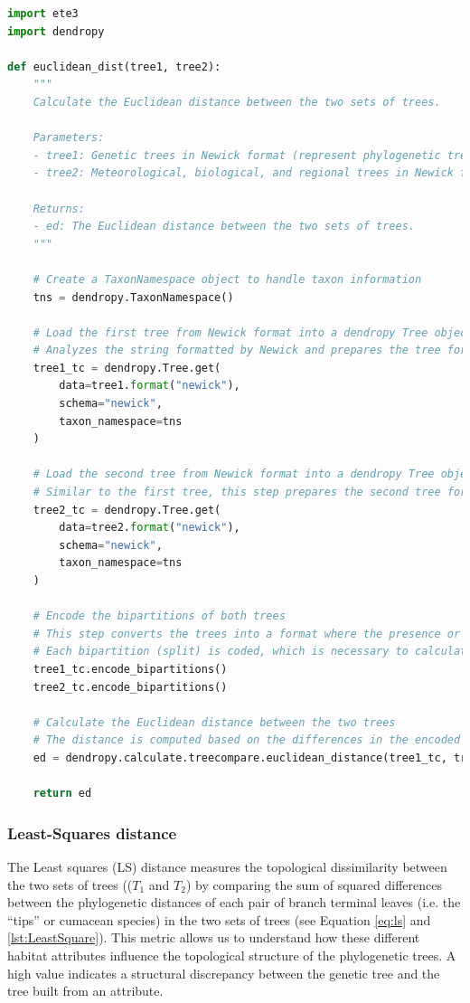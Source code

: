 \begin{lstlisting}[label=lst:euclideanDist,language=Python,caption=Python script for calculating the Euclidean distance using the ete3 and the dendropy packages in the aPhyloGeo package]
import ete3
import dendropy

def euclidean_dist(tree1, tree2):
    """
    Calculate the Euclidean distance between the two sets of trees.

    Parameters:
    - tree1: Genetic trees in Newick format (represent phylogenetic trees in text form).
    - tree2: Meteorological, biological, and regional trees in Newick format (represent attributes trees in text form).

    Returns:
    - ed: The Euclidean distance between the two sets of trees.
    """
    
    # Create a TaxonNamespace object to handle taxon information
    tns = dendropy.TaxonNamespace()

    # Load the first tree from Newick format into a dendropy Tree object
    # Analyzes the string formatted by Newick and prepares the tree for comparison.
    tree1_tc = dendropy.Tree.get(
        data=tree1.format("newick"), 
        schema="newick", 
        taxon_namespace=tns
    )
    
    # Load the second tree from Newick format into a dendropy Tree object
    # Similar to the first tree, this step prepares the second tree for comparison.
    tree2_tc = dendropy.Tree.get(
        data=tree2.format("newick"), 
        schema="newick", 
        taxon_namespace=tns
    )

    # Encode the bipartitions of both trees
    # This step converts the trees into a format where the presence or absence of 
    # Each bipartition (split) is coded, which is necessary to calculate distances.
    tree1_tc.encode_bipartitions()
    tree2_tc.encode_bipartitions()

    # Calculate the Euclidean distance between the two trees
    # The distance is computed based on the differences in the encoded bipartitions.
    ed = dendropy.calculate.treecompare.euclidean_distance(tree1_tc, tree2_tc)

    return ed
\end{lstlisting}

\subsubsection{Least-Squares distance}\label{LS}
The Least squares (LS) distance measures the topological dissimilarity between the two sets of trees (($T_1$ and $T_2$) by comparing the sum of squared differences between the phylogenetic distances of each pair of branch terminal leaves (i.e. the “tips” or cumacean species) in the two sets of trees (see Equation \eqref{eq:ls} and \autoref{lst:LeastSquare}). This metric allows us to understand how these different habitat attributes influence the topological structure of the phylogenetic trees. A high value indicates a structural discrepancy between the genetic tree and the tree built from an attribute.

